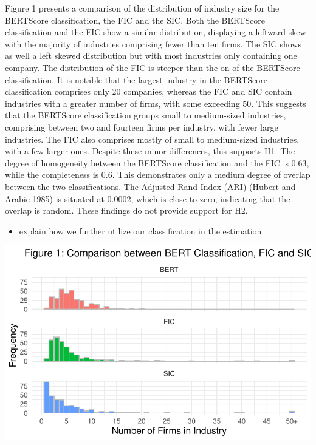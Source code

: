 \documentclass[
]{article}
\providecommand{\tightlist}{%
  \setlength{\itemsep}{0pt}\setlength{\parskip}{0pt}}\usepackage{longtable,booktabs,array}
\begin{document}
Figure 1 presents a comparison of the distribution of industry size for
the BERTScore classification, the FIC and the SIC. Both the BERTScore
classification and the FIC show a similar distribution, displaying a
leftward skew with the majority of industries comprising fewer than ten
firms. The SIC shows as well a left skewed distribution but with most
industries only containing one company. The distribution of the FIC is
steeper than the on of the BERTScore classification. It is notable that
the largest industry in the BERTScore classification comprises only 20
companies, whereas the FIC and SIC contain industries with a greater
number of firms, with some exceeding 50. This suggests that the
BERTScore classification groups small to medium-sized industries,
comprising between two and fourteen firms per industry, with fewer large
industries. The FIC also comprises mostly of small to medium-sized
industries, with a few larger ones. Despite these minor differences,
this supports H1. The degree of homogeneity between the BERTScore
classification and the FIC is 0.63, while the completeness is 0.6. This
demonstrates only a medium degree of overlap between the two
classifications. The Adjusted Rand Index (ARI) (Hubert and Arabie 1985)
is situated at 0.0002, which is close to zero, indicating that the
overlap is random. These findings do not provide support for H2.

\begin{itemize}
\tightlist
\item
  explain how we further utilize our classification in the estimation
\end{itemize}

\includegraphics{ProjectEcoDataScience_files/figure-pdf/unnamed-chunk-4-1.pdf}
\end{document}
